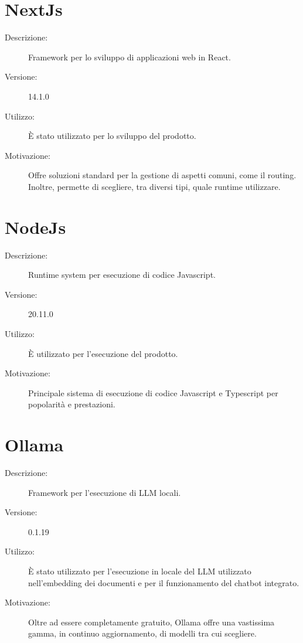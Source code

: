 \section{NextJs}
\begin{description}
\item[Descrizione:] Framework per lo sviluppo di applicazioni web in React.
\item[Versione:] 14.1.0
\item[Utilizzo:] È stato utilizzato per lo sviluppo del prodotto.
\item[Motivazione:] Offre soluzioni standard per la gestione di aspetti comuni, come il routing. Inoltre, permette di scegliere, tra diversi tipi, quale runtime utilizzare.
\end{description}

\section{NodeJs}
\begin{description}
\item[Descrizione:] Runtime system per esecuzione di codice Javascript.
\item[Versione:] 20.11.0
\item[Utilizzo:] È utilizzato per l'esecuzione del prodotto.
\item[Motivazione:] Principale sistema di esecuzione di codice Javascript e Typescript per popolarità e prestazioni.
\end{description}

\section{Ollama}
\begin{description}
\item[Descrizione:] Framework per l'esecuzione di LLM locali.
\item[Versione:] 0.1.19
\item[Utilizzo:] È stato utilizzato per l'esecuzione in locale del LLM utilizzato nell'embedding dei documenti e per il funzionamento del chatbot integrato.
\item[Motivazione:] Oltre ad essere completamente gratuito, Ollama offre una vastissima gamma, in continuo aggiornamento, di modelli  tra cui scegliere.
\end{description}

